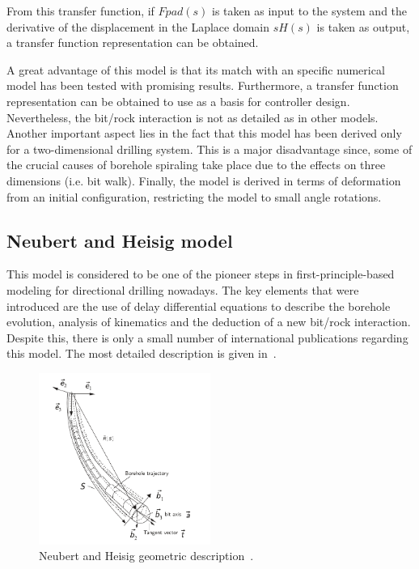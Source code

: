 From this transfer function, if $Fpad(s)$ is taken as input to the system and the derivative of the displacement in the Laplace domain $sH(s)$ is taken as output, a transfer function representation can be obtained.

A great advantage of this model is that its match with an specific numerical model has been tested with promising results. Furthermore, a transfer function representation can be obtained to use as a basis for controller design. Nevertheless, the bit/rock interaction is not as detailed as in other models. Another important aspect lies in the fact that this model has been derived only for a two-dimensional drilling system. This is a major disadvantage since, some of the crucial causes of borehole spiraling take place due to the effects on three dimensions (i.e. bit walk). Finally, the model is derived in terms of deformation from an initial configuration, restricting the model to small angle rotations.

\subsection{Neubert and Heisig model}\label{subsection:Neubert}

This model is considered to be one of the pioneer steps in first-principle-based modeling for directional drilling nowadays. The key elements that were introduced are the use of delay differential equations to describe the borehole evolution, analysis of kinematics and the deduction of a new bit/rock interaction. Despite this, there is only a small number of international publications regarding this model. The most detailed description is given in~\cite{NeubertM.andHeisig1997}. 

\begin{figure}[ht]\centering
	\includegraphics[width=0.5\textwidth]{img/Neubert.pdf}
	\caption{\label{fig:Neubert}Neubert and Heisig geometric description~\cite{NeubertM.andHeisig1997}.}
\end{figure}

